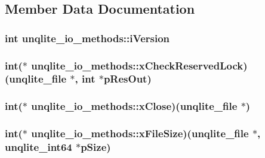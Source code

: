 \subsection{Member Data Documentation}
\hypertarget{structunqlite__io__methods_ac468d05f4326d59d672dc8a9b889b6dc}{
\subsubsection[{i\-Version}]{\setlength{\rightskip}{0pt plus 5cm}int unqlite\-\_\-io\-\_\-methods\-::i\-Version}}\label{d6/d9e/structunqlite__io__methods_ac468d05f4326d59d672dc8a9b889b6dc}
\hypertarget{structunqlite__io__methods_a1f51d4873b4990af2970b380df2b0f82}{
\subsubsection[{x\-Check\-Reserved\-Lock}]{\setlength{\rightskip}{0pt plus 5cm}int($\ast$ unqlite\-\_\-io\-\_\-methods\-::x\-Check\-Reserved\-Lock)({\bf unqlite\-\_\-file} $\ast$, int $\ast$p\-Res\-Out)}}\label{d6/d9e/structunqlite__io__methods_a1f51d4873b4990af2970b380df2b0f82}
\hypertarget{structunqlite__io__methods_a2d7ee9eab774e16465184adcc9f860a2}{
\subsubsection[{x\-Close}]{\setlength{\rightskip}{0pt plus 5cm}int($\ast$ unqlite\-\_\-io\-\_\-methods\-::x\-Close)({\bf unqlite\-\_\-file} $\ast$)}}\label{d6/d9e/structunqlite__io__methods_a2d7ee9eab774e16465184adcc9f860a2}
\hypertarget{structunqlite__io__methods_a6da907a6e006b7f4738eb870960efc8a}{
\subsubsection[{x\-File\-Size}]{\setlength{\rightskip}{0pt plus 5cm}int($\ast$ unqlite\-\_\-io\-\_\-methods\-::x\-File\-Size)({\bf unqlite\-\_\-file} $\ast$, {\bf unqlite\-\_\-int64} $\ast$p\-Size)}}\label{d6/d9e/structunqlite__io__methods_a6da907a6e006b7f4738eb870960efc8a}
